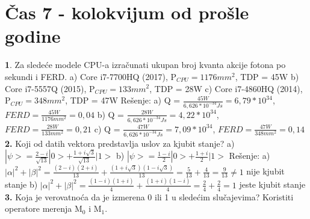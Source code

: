 \documentclass{article}
\begin{document}
\section{Čas 7 - kolokvijum od prošle godine}
\textbf{1}. Za sledeće modele CPU-a izračunati ukupan broj kvanta akcije fotona po sekundi i FERD.\newline
a) Core i7-7700HQ (2017), P$_{CPU} = 1176mm^2$, TDP = 45W \newline
b) Core i7-5557Q (2015), P$_{CPU} = 133mm^2$, TDP = 28W \newline
c) Core i7-4860HQ (2014), P$_{CPU} = 348mm^2$, TDP = 47W 
\vspace*{0.4cm}\newline
Rešenje: \vspace{0.2cm}\newline
a) Q = $\frac{45W}{6,626*10^{-34}Js} = 6,79*10^{34}$, $FERD = \frac{45W}{1176mm^2} = 0,04$ \vspace{0.1cm}\newline
b) Q = $\frac{28W}{6,626*10^{-34}Js} = 4,22*10^{34}$, $FERD = \frac{28W}{133mm^2} = 0,21$ \vspace{0.1cm}\newline
c) Q = $\frac{47W}{6,626*10^{-34}Js} = 7,09*10^{34}$, $FERD = \frac{47W}{348mm^2} = 0,14$
\vspace{0.4cm}\newline
\textbf{2.} Koji od datih vektora predstavlja uslov za kjubit stanje?\newline
a) $|\psi> = \frac{2-i}{\sqrt{13}}|0> + \frac{1+i\sqrt{3}}{\sqrt{13}}|1>$
\vspace{0.1cm}\newline
b) $|\psi> = \frac{1-i}{2}|0> + \frac{1+i}{2}|1>$
\vspace*{0.4cm}\newline
Rešenje: \vspace{0.2cm}\newline
a) $|\alpha|^2 + |\beta|^2 = \frac{(2-i)(2+i)}{13} + \frac{(1+i\sqrt{3})(1-i\sqrt{3})}{13} = \frac{5}{13} + \frac{4}{13} = \frac{9}{13} \neq 1$ nije kjubit stanje
\vspace{0.1cm}\newline
b) $|\alpha|^2 + |\beta|^2 = \frac{(1-i)(1+i)}{4} + \frac{(1+i)(1-i)}{4} = \frac{2}{4} + \frac{2}{4} = 1$ jeste kjubit stanje
\vspace{0.4cm}\newline
\textbf{3.} Koja je verovatnoća da je izmerena 0 ili 1 u sledećim slučajevima? Koristiti operatore merenja M$_0$ i M$_1$.\newline
\end{document}
